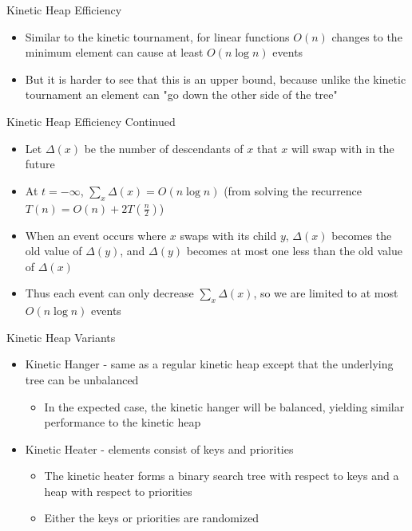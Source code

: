 \documentclass[aspectratio=169, handout]{beamer}
\begin{document}
\begin{frame}{Kinetic Heap Efficiency}
    \begin{itemize}
        \item Similar to the kinetic tournament, for linear functions $O(n)$ changes to the minimum element can cause at least $O(n \log n)$ events
        \item But it is harder to see that this is an upper bound, because unlike the kinetic tournament an element can "go down the other side of the tree"
    \end{itemize}
\end{frame}

\begin{frame}{Kinetic Heap Efficiency Continued}
    \begin{itemize}
        \item Let $\Delta(x)$ be the number of descendants of $x$ that $x$ will swap with in the future
        \item At $t = -\infty$, $\sum_{x} \Delta(x) = O(n \log n)$ (from solving the recurrence $T(n) = O(n) + 2T(\frac n 2)$)
        \pause
        \item When an event occurs where $x$ swaps with its child $y$, $\Delta(x)$ becomes the old value of $\Delta(y)$, and $\Delta(y)$ becomes at most one less than the old value of $\Delta(x)$
        \item Thus each event can only decrease $\sum_{x} \Delta(x)$, so we are limited to at most $O(n \log n)$ events
    \end{itemize}
\end{frame}

\begin{frame}{Kinetic Heap Variants}
    \begin{itemize}
        \item Kinetic Hanger - same as a regular kinetic heap except that the underlying tree can be unbalanced
        \begin{itemize}
            \item In the expected case, the kinetic hanger will be balanced, yielding similar performance to the kinetic heap
        \end{itemize}
        \item Kinetic Heater - elements consist of keys and priorities
        \begin{itemize}
            \item The kinetic heater forms a binary search tree with respect to keys and a heap with respect to priorities
            \item Either the keys or priorities are randomized
        \end{itemize}
    \end{itemize}
\end{frame}
\end{document}
